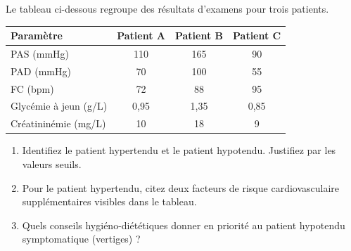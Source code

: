 \documentclass[11pt]{article}
\begin{document}
\begin{exercice}
Le tableau ci-dessous regroupe des résultats d'examens pour trois patients.
\begin{tabularx}{\linewidth}{|X|c|c|c|}
\hline
\textbf{Paramètre} & \textbf{Patient A} & \textbf{Patient B} & \textbf{Patient C} \\
\hline
PAS (mmHg) & 110 & 165 & 90 \\
PAD (mmHg) & 70 & 100 & 55 \\
FC (bpm) & 72 & 88 & 95 \\
Glycémie à jeun (g/L) & 0,95 & 1,35 & 0,85 \\
Créatininémie (mg/L) & 10 & 18 & 9 \\
\hline
\end{tabularx}
\begin{enumerate}
\item Identifiez le patient hypertendu et le patient hypotendu. Justifiez par les valeurs seuils.
\item Pour le patient hypertendu, citez deux facteurs de risque cardiovasculaire supplémentaires visibles dans le tableau.
\item Quels conseils hygiéno-diététiques donner en priorité au patient hypotendu symptomatique (vertiges) ?
\end{enumerate}
\end{exercice}
\end{document}
